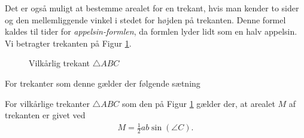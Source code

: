 Det er også muligt at bestemme arealet for en trekant, hvis man kender to sider og den mellemliggende vinkel i stedet for højden på trekanten. Denne formel kaldes til tider for \textit{appelsin-formlen}, da formlen lyder lidt som en halv appelsin. Vi betragter trekanten på Figur \ref{fig:vilkårlig}.
\begin{figure}[H]
	\centering
	\caption{Vilkårlig trekant $\triangle ABC$}
	\label{fig:vilkårlig}
\end{figure}
For trekanter som denne gælder der følgende sætning
\begin{setn}
	For vilkårlige trekanter $\triangle ABC$ som den på Figur \ref{fig:vilkårlig} gælder der,
	 at arealet $M$ af trekanten er givet ved
	 \begin{align*}
	 	M = \frac{1}{2}ab \sin(\angle C).
	 \end{align*}
\end{setn}

